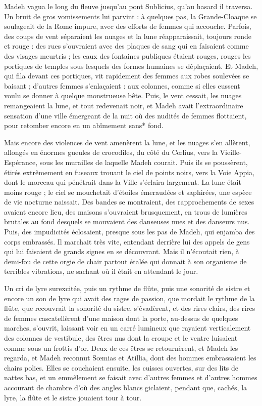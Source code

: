 \documentclass[a4paper, 11pt, oneside, polutonikogreek, french]{article}
\begin{document}
Madeh vagua le long du fleuve jusqu'au pont Sublicius, qu'au hasard il traversa. Un bruit de gros vomissements lui parvint : à quelques pas, la Grande-Cloaque se soulageait de la Rome impure, avec des efforts de femmes qui accouche. Parfois, des coups de vent séparaient les nuages et la lune réapparaissait, toujours ronde et rouge : des rues s'ouvraient avec des plaques de sang qui en faisaient comme des visages meurtris ; les eaux des fontaines publiques étaient rouges, rouges les portiques de temples sous lesquels des formes humaines se déplaçaient. Et Madeh, qui fila devant ces portiques, vit rapidement des femmes aux robes soulevées se baisant ; d'autres femmes s’enlaçaient : aux colonnes, comme si elles eussent voulu se donner à quelque monstrueuse bête. Puis, le vent cessait, les nuages remangeaient la lune, et tout redevenait noir, et Madeh avait l'extraordinaire sensation d'une ville émergeant de la nuit où des nudités de femmes flottaient, pour retomber encore en un abîmement sans* fond.

Mais encore des violences de vent amenèrent la lune, et les nuages s'en allèrent, allongés en énormes gueules de crocodiles, du côté du Cœlius, vers la Vieille-Espérance, sous les murailles de laquelle Madeh courait. Puis ils se poussèrent, étirés extrêmement en fuseaux trouant le ciel de points noirs, vers la Voie Appia, dont le morceau qui pénétrait dans la Ville s'éclaira largement. La lune était moins rouge ; le ciel se mouchetait d'étoiles émeraudées et saphirées, une espèce de vie nocturne naissait. Des bandes se montraient, des rapprochements de sexes avaient encore lieu, des maisons s'ouvraient brusquement, en trous de lumières brutales au fond desquels se mouvaient des danseuses nues et des danseurs nus. Puis, des impudicités éclosaient, presque sous les pas de Madeh, qui enjamba des corps embrassés. Il marchait très vite, entendant derrière lui des appels de gens qui lui faisaient de grands signes en se découvrant. Mais il n'écoutait rien, à demi-fou de cette orgie de chair partout étalée qui donnait à son organisme de terribles vibrations, ne sachant où il était en attendant le jour.

Un cri de lyre surexcitée, puis un rythme de flûte, puis une sonorité de sistre et encore un son de lyre qui avait des rages de passion, que mordait le rythme de la flûte, que recouvrait la sonorité du sistre, s'évadèrent, et des rires clairs, des rires de femmes cascatellèrent d'une maison dont la porte, au-dessus de quelques marches, s'ouvrit, laissant voir en un carré lumineux que rayaient verticalement des colonnes de vestibule, des êtres nus dont la croupe et le ventre luisaient comme sous un frottis d'or. Deux de ces êtres se retournèrent, et Madeh les regarda, et Madeh reconnut Sœmias et Atillia, dont des hommes embrassaient les chairs polies. Elles se couchaient ensuite, les cuisses ouvertes, sur des lits de nattes bas, et un emmêlement se faisait avec d'autres femmes et d'autres hommes accourant de chambre d'où des angles blancs giclaient, pendant que, cachés, la lyre, la flûte et le sistre jouaient tour à tour.
\end{document}
